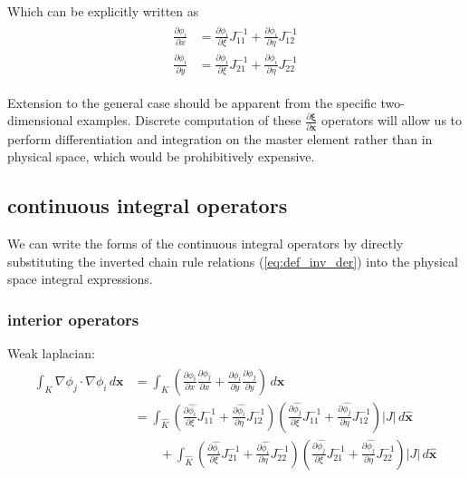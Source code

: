\documentclass[10pt]{article}
\begin{document}
Which can be explicitly written as 
\begin{align}
    \begin{split}
    \frac{\partial \phi_i}{\partial x}
    &= \frac{\partial \phi_i}{\partial \xi} J^{-1}_{11}
    + \frac{\partial \phi_i}{\partial \eta} J^{-1}_{12} \\
    \frac{\partial \phi_i}{\partial y}
    &= \frac{\partial \phi_i}{\partial \xi} J^{-1}_{21}
    + \frac{\partial \phi_i}{\partial \eta} J^{-1}_{22}
    \end{split}
    \label{eq:def_inv_der}
\end{align}

Extension to the general case should be apparent from the specific two-dimensional examples.
Discrete computation of these $\frac{\partial \bm{\xi}}{\partial \bm{x}}$ operators will allow us to
perform differentiation and integration on the master element rather than in physical space, which
would be prohibitively expensive.

\subsection{continuous integral operators} \label{ssec:integral_operators}

We can write the forms of the continuous integral operators by directly substituting the inverted
chain rule relations (\ref{eq:def_inv_der}) into the physical space integral expressions.

  \subsubsection{interior operators}

  Weak laplacian:
  \begin{align}
    \begin{split}
    \int_{K}^{} \nabla\phi_j\cdot\nabla\phi_i \,d\bm{x}
    &= \int_{K}^{} \left( \frac{\partial \phi_i}{\partial x} \frac{\partial \phi_j}{\partial x}
    + \frac{\partial \phi_i}{\partial y} \frac{\partial \phi_j}{\partial y}\right)\,d\bm{x} \\
    &=
    \int_{\widehat{K}} 
    \left( \frac{\partial \widehat{\phi_i}}{\partial \xi} J^{-1}_{11} 
    + \frac{\partial \widehat{\phi_i}}{\partial \eta} J^{-1}_{12} \right) 
    \left( \frac{\partial \widehat{\phi_j}}{\partial \xi} J^{-1}_{11} 
    + \frac{\partial \widehat{\phi_j}}{\partial \eta} J^{-1}_{12} \right) 
    |J|\,d\bm{\widehat{x}} \\
    &\qquad + 
    \int_{\widehat{K}} 
    \left( \frac{\partial \widehat{\phi_i}}{\partial \xi} J^{-1}_{21} 
    + \frac{\partial \widehat{\phi_i}}{\partial \eta} J^{-1}_{22} \right) 
    \left( \frac{\partial \widehat{\phi_j}}{\partial \xi} J^{-1}_{21} 
    + \frac{\partial \widehat{\phi_j}}{\partial \eta} J^{-1}_{22} \right) 
    |J|\,d\bm{\widehat{x}} \\
    \end{split}
    \label{eq:cts_weak_laplacian}
  \end{align}
\end{document}
